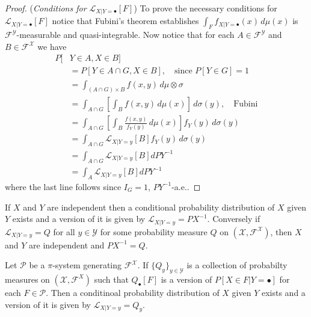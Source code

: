 \begin{proof}
({\sl Conditions for $\mathcal L_{X|Y=\bullet}[F]$})
To prove the necessary conditions for $\mathcal L_{X|Y=\bullet}[F]$ notice that Fubini's theorem establishes $\int_F f_{X|Y = \bullet}(x)\,d\mu(x)$ is $\mathcal F^{\mathcal Y}$-measurable and quasi-integrable. Now notice that for each $A\in \mathcal F^{\mathcal Y}$ and $B\in \mathcal F^{\mathcal X}$ we have
\begin{align*}
P[&Y\in A, X\in B] \\
& = P[Y\in A\cap G, X\in B],  \quad \text{since $P[Y\in G] = 1$}\\
&= \int_{(A\cap G)\times B} f(x,y) \,d\mu\otimes \sigma \\
&= \int_{A\cap G} \left[\int_B f(x,y) \,d\mu(x)\right]  \,d\sigma(y) , \quad\text{Fubini} \\
&= \int_{A\cap G} \left[\int_B \frac{f(x,y)}{f_Y(y)}\,d\mu(x)\right]  f_Y(y)\,d\sigma(y) \\
&= \int_{A\cap G}  \mathcal L_{X|Y=y}[B] f_Y(y)\,d\sigma(y) \\
&= \int_{A\cap G}  \mathcal L_{X|Y=y}[B] dPY^{-1} \\
&= \int_{A} \mathcal L_{X|Y=y}[B] dPY^{-1}
\end{align*}
where the last line follows since $I_G=1$, $PY^{-1}$-a.e..
\end{proof}





\begin{theorem}
If $X$ and $Y$ are independent then a conditional probability distribution of $X$ given $Y$ exists and a version of it is given by  $\mathcal L_{X|Y=y}= PX^{-1}$. Conversely if $\mathcal L_{X|Y = y} = Q$ for all $y\in \mathcal Y$ for some probability measure $Q$ on $(\mathcal X,\mathcal F^{\mathcal X})$, then $X$ and $Y$ are independent and $PX^{-1} = Q$.
\end{theorem}



\begin{theorem}
Let $\mathcal P$ be a $\pi$-system generating $\mathcal F^{\mathcal X}$. If $\{Q_y \}_{y\in\mathcal Y}$ is a collection of probabilty measures on $(\mathcal X,\mathcal F^{X})$ such that $Q_\bullet[F]$ is a version of $P[X\in F | Y=\bullet]$ for each $F\in \mathcal P$. Then a conditinoal probability distribution of $X$ given $Y$ exists and a version of it is given by $\mathcal L_{X|Y=y} = Q_y$.
\end{theorem}

